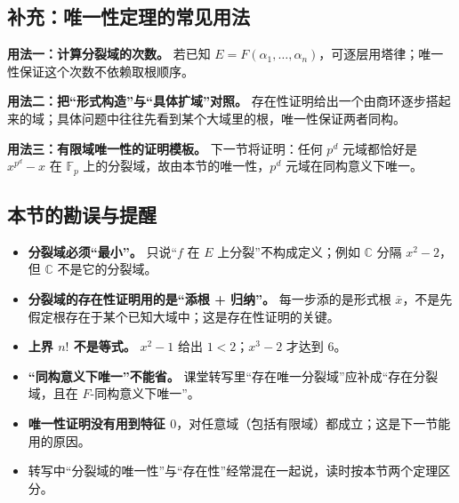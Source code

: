 \subsection{补充：唯一性定理的常见用法}


\textbf{用法一：计算分裂域的次数。} 若已知 $E=F(\alpha_1,\dots,\alpha_n)$，可逐层用塔律；唯一性保证这个次数不依赖取根顺序。

\textbf{用法二：把“形式构造”与“具体扩域”对照。} 存在性证明给出一个由商环逐步搭起来的域；具体问题中往往先看到某个大域里的根，唯一性保证两者同构。

\textbf{用法三：有限域唯一性的证明模板。} 下一节将证明：任何 $p^d$ 元域都恰好是 $x^{p^d}-x$ 在 $\mathbb F_p$ 上的分裂域，故由本节的唯一性，$p^d$ 元域在同构意义下唯一。

\subsection{本节的勘误与提醒}


\begin{itemize}
\item \textbf{分裂域必须“最小”。} 只说“$f$ 在 $E$ 上分裂”不构成定义；例如 $\mathbb C$ 分隔 $x^2-2$，但 $\mathbb C$ 不是它的分裂域。
\item \textbf{分裂域的存在性证明用的是“添根 + 归纳”。} 每一步添的是形式根 $\bar x$，不是先假定根存在于某个已知大域中；这是存在性证明的关键。
\item \textbf{上界 $n!$ 不是等式。} $x^2-1$ 给出 $1<2$；$x^3-2$ 才达到 $6$。
\item \textbf{“同构意义下唯一”不能省。} 课堂转写里“存在唯一分裂域”应补成“存在分裂域，且在 $F$-同构意义下唯一”。
\item \textbf{唯一性证明没有用到特征 $0$}，对任意域（包括有限域）都成立；这是下一节能用的原因。
\item 转写中“分裂域的唯一性”与“存在性”经常混在一起说，读时按本节两个定理区分。
\end{itemize}

